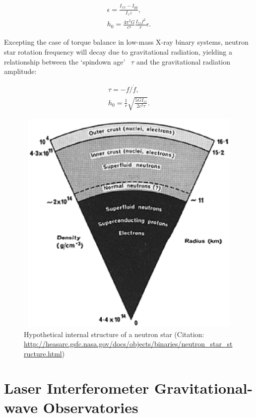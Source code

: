         \begin{eqnarray}
        \epsilon = \frac{I_{xx} - I_{yy}}{I_zz}, \\
        h_0 = \frac{4 \pi^2 G}{c^4} \frac{I_{zz} f^2}{r} \epsilon.
        \end{eqnarray}

Excepting the case of torque balance in low-mass X-ray binary systems, neutron star rotation frequency will decay due to gravitational radiation, yielding a relationship between the `spindown age'~\cite{Brady1998} $\tau$ and the gravitational radiation amplitude:

        \begin{eqnarray}
        \tau = -f / \dot{f}, \\
        h_0 = \frac{1}{r} \sqrt{\frac{5 G I_{zz}}{2 c^2 \tau}}.
        \end{eqnarray}

	\begin{figure}
	\begin{center}
	\includegraphics[height=111mm, width=148mm]{neutron_star_structure.eps}
	\caption{Hypothetical internal structure of a neutron star (Citation: \url{http://heasarc.gsfc.nasa.gov/docs/objects/binaries/neutron_star_structure.html})} 
	\label{neutron_star_structure}
	\end{center}
	\end{figure}


    \section{Laser Interferometer Gravitational-wave Observatories}
    \label{LIGO}
        
